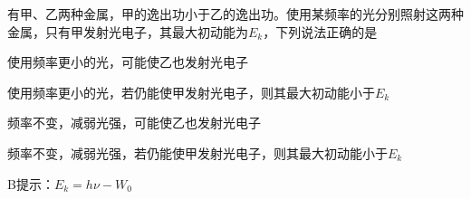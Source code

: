 有甲、乙两种金属，甲的逸出功小于乙的逸出功。使用某频率的光分别照射这两种金属，只有甲发射光电子，其最大初动能为\(E_k\)，下列说法正确的是\paren[]
\begin{choices}
	\item 使用频率更小的光，可能使乙也发射光电子
	\item 使用频率更小的光，若仍能使甲发射光电子，则其最大初动能小于\(E_k\)
	\item 频率不变，减弱光强，可能使乙也发射光电子
	\item 频率不变，减弱光强，若仍能使甲发射光电子，则其最大初动能小于\(E_k\)
\end{choices}
\begin{answer}
	B\qquad 提示：\(E_k = h\nu - W_0\)
\end{answer}
